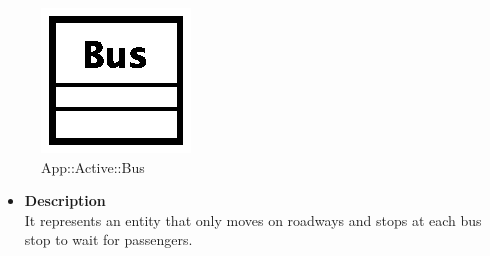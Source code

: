 \begin{figure}[h]
\centering
\includegraphics[scale=0.6,keepaspectratio]{images/solution/bus.eps}
\caption{App::Active::Bus}
\label{fig:sd-app-bus}
\end{figure}
\FloatBarrier
\begin{itemize}
  \item \textbf{Description} \\
It represents an entity that only moves on roadways and stops at each bus stop to
wait for passengers.
\end{itemize} 
